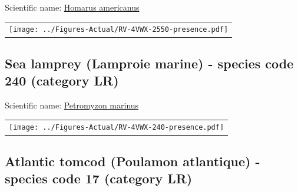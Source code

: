 \documentclass[12pt]{article}\usepackage[]{graphicx}\usepackage[]{color}
\begin{document}
  


Scientific name: \href{http://www.marinespecies.org/aphia.php?p=taxdetails\&id=156134}{Homarus americanus} \newline
\begin{minipage}{1.0\textwidth}
 \begin{tabular}{c}
\texttt{[image: ../Figures-Actual/RV-4VWX-2550-presence.pdf]} \\ 
\end{tabular} 
\end{minipage}
\clearpage

\renewcommand\thefigure{\thesubsection\Alph{figure}}

\setcounter{figure}{0}

\hypertarget{sec:240}{%
\subsection{Sea lamprey (Lamproie marine) - species code 240 (category LR)}\label{sec:240}}

  


Scientific name: \href{http://www.marinespecies.org/aphia.php?p=taxdetails\&id=101174}{Petromyzon marinus} \newline
\begin{minipage}{1.0\textwidth}
 \begin{tabular}{c}
\texttt{[image: ../Figures-Actual/RV-4VWX-240-presence.pdf]} \\ 
\end{tabular} 
\end{minipage}
\clearpage

\renewcommand\thefigure{\thesubsection\Alph{figure}}

\setcounter{figure}{0}

\hypertarget{sec:17}{%
\subsection{Atlantic tomcod (Poulamon atlantique) - species code 17 (category LR)}\label{sec:17}}

  
\end{document}
